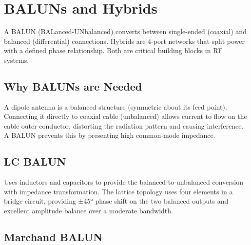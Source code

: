 \section{BALUNs and Hybrids}\label{sec:wiki_balun}



A BALUN (BALanced-UNbalanced) converts between single-ended (coaxial) and balanced (differential) connections. Hybrids are 4-port networks that split power with a defined phase relationship. Both are critical building blocks in RF systems.

				

\subsection{Why BALUNs are Needed}

				

A dipole antenna is a balanced structure (symmetric about its feed point). Connecting it directly to coaxial cable (unbalanced) allows current to flow on the cable outer conductor, distorting the radiation pattern and causing interference. A BALUN prevents this by presenting high common-mode impedance.


				

\subsection{LC BALUN}

				


				

Uses inductors and capacitors to provide the balanced-to-unbalanced conversion with impedance transformation. The lattice topology uses four elements in a bridge circuit, providing ±45° phase shift on the two balanced outputs and excellent amplitude balance over a moderate bandwidth.

				

\subsection{Marchand BALUN}

